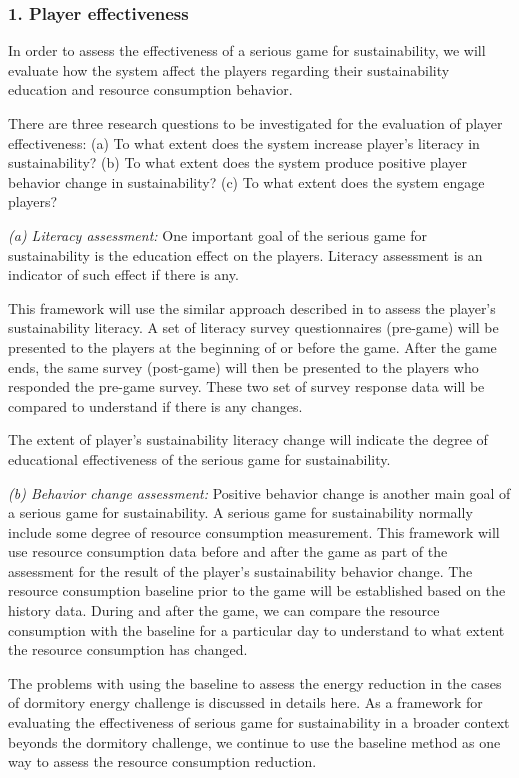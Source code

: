 \documentclass{sigchi}
\begin{document}
\subsubsection{1. Player effectiveness}
In order to assess the effectiveness of a serious game for sustainability, we will evaluate how the system affect the players regarding their sustainability education and resource consumption behavior.

There are three research questions to be investigated for the evaluation of player effectiveness: (a) To what extent does the system increase player's literacy in sustainability? (b) To what extent does the system produce positive player behavior change in sustainability? (c) To what extent does the system engage players?

\emph {(a) Literacy assessment:}
One important goal of the serious game for sustainability is the education effect on the players. Literacy assessment is an indicator of such effect if there is any.

This framework will use the similar approach described in \cite{csdl2-10-08} to assess the player's sustainability literacy. A set of literacy survey questionnaires (pre-game) will be presented to the players at the beginning of or before the game. After the game ends, the same survey (post-game) will then be presented to the players who responded the pre-game survey. These two set of survey response data will be compared to understand if there is any changes.

The extent of player's sustainability literacy change will indicate the degree of educational effectiveness of the serious game for sustainability.

\emph {(b) Behavior change assessment:}
Positive behavior change is another main goal of a serious game for sustainability. A serious game for sustainability normally include some degree of resource consumption measurement. This framework will use resource consumption data before and after the game as part of the assessment for the result of the player's sustainability behavior change.  The resource consumption baseline prior to the game will be established based on the history data. During and after the game, we can compare the resource consumption with the baseline for a particular day to understand to what extent the resource consumption has changed.

The problems with using the baseline to assess the energy reduction in the cases of dormitory energy challenge is discussed in details here\cite{csdl2-12-08}.
 As a framework for evaluating the effectiveness of serious game for sustainability in a broader context beyonds the dormitory challenge, we continue to use the baseline method as one way to assess the resource consumption reduction.
\end{document}
